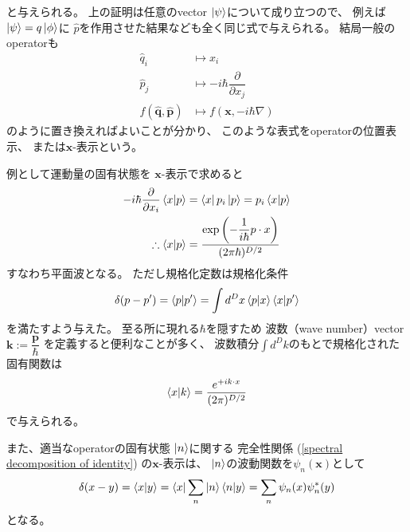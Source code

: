 と与えられる。
上の証明は任意のvector
$\ket{\psi}$について成り立つので、
例えば$\ket{\psi} = q \ket{\phi}$に
$\hat{p}$を作用させた結果なども全く同じ式で与えられる。
結局一般のoperatorも
\begin{subequations}
\begin{align}
    \hat{q}_i
    &\mapsto
    x_i
\\
    \hat{p}_j
    &\mapsto
    - i \hbar
    \dfrac{\partial}{\partial x_j}
\\
    f( \hat{\bm{q}}, \hat{\bm{p}} )
    &\mapsto
    f
    \left( \bm{x}, 
        - i \hbar
        \nabla
    \right)
\end{align}
\end{subequations}
のように置き換えればよいことが分かり、
このような表式をoperatorの位置表示、
または$\bm{x}$-表示という。

例として運動量の固有状態を
$\bm{x}$-表示で求めると
\begin{align}
    - i \hbar
    \dfrac{\partial}{\partial x_i}
    \braket{ x | p }
    &=
    \bra{ x }
    p_i
    \ket{ p }
    =
    p_i
    \braket{ x | p }
\notag\\\therefore
    \braket{ x | p }
    &=
    \dfrac{
        \exp\left(
            -
            \dfrac{1}{i\hbar}
            p \cdot x
        \right)
    }{ (2 \pi \hbar)^{D/2} }
\label{plain wave in qm}
\end{align}
すなわち平面波となる。
ただし規格化定数は規格化条件
\begin{align}
    \delta( p - p' )
    =
    \braket{ p | p' }
    =
    \int d^D x
    \braket{ p | x }
    \braket{ x | p' }
\end{align}
を満たすよう与えた。
至る所に現れる$\hbar$を隠すため
波数（wave number）vector
$\bm{k} := \dfrac{ \bm{p} }{\hbar}$
を定義すると便利なことが多く、
波数積分$\int d^D k$のもとで規格化された
固有関数は
\begin{align}
    \braket{x | k}
    =
    \dfrac{
        e^{
            + i
            k \cdot x
        }
    }{ (2 \pi)^{D/2} }
\end{align}
で与えられる。

また、適当なoperatorの固有状態
$\ket{n}$に関する
完全性関係
(\ref{spectral decomposition of identity})
の$\bm{x}$-表示は、
$\ket{n}$の波動関数を$\psi_n( \bm{x} )$として
\begin{align}
    \delta(x - y)
    =
    \braket{ x | y }
    =
    \bra{ x }
        \sum_n
        \ket{n}
        \braket{ n | y }
    =
    \sum_n
    \psi_n( x )
    \psi_n^*( y )
\label{complete set of wave function}
\end{align}
となる。

